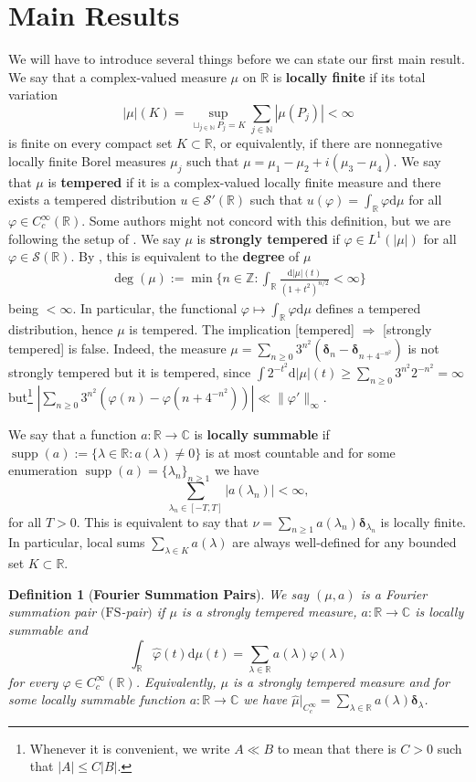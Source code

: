 \documentclass[a4paper,reqno,12pt]{amsart}
\DeclareMathOperator{\supp}{\mathrm{supp}}
\newtheorem{definition}{Definition}
\renewcommand{\S}{\mathcal{S}}
\newcommand{\n}{\mathbb{N}}
\newcommand{\z}{\mathbb{Z}}
\renewcommand{\r}{\mathbb{R}}
\newcommand{\cp}{\mathbb{C}} %
\newcommand{\ft}{\widehat}
\newcommand{\bo}{\boldsymbol}
\newcommand{\la}{\lambda}
\newcommand{\p}{\varphi}
\renewcommand{\d}{\mathrm{d}}
\newcommand{\1}{{\bf 1}}
\newcommand{\fs}{\mathrm{FS}}
\renewcommand{\emph}[1]{{\bf #1}}
\renewcommand{\1}{{\bo 1}}
\newcommand{\del}{{\bo \delta}}
\begin{document}
\section{Main Results}
We will have to introduce several things before we can state our first main result. We say that a complex-valued measure $\mu$ on $\r$ is \emph{locally finite} if its total variation 
$$
|\mu|(K) = \sup_{\sqcup_{j\in\n} P_j = K} \sum_{j\in\n} |\mu(P_j)| < \infty
$$
is finite on every compact set $K\subset \r$, or equivalently, if there are nonnegative locally finite Borel measures $\mu_{j}$ such that $\mu=\mu_1-\mu_2 + i(\mu_3-\mu_4)$. We say that $\mu$ is \emph{tempered} if it is a complex-valued locally finite measure and there exists a tempered distribution $u\in \S'(\r)$ such that $u(\p)=\int_\r \p \d\mu$ for all $\p\in C^\infty_c(\r)$. Some authors might not concord with this definition, but we are following the setup of \cite{BS}. We say  $\mu$ is \emph{strongly tempered} if $\p\in L^1(|\mu|)$ for all $\p\in \S(\r)$. By \cite[Prop. 2.5]{BS}, this is equivalent to the  \emph{degree} of $\mu$
\begin{align}\label{eq:decaymu}
\deg(\mu):=\min \bigg\{ n\in \z : \int_\r \frac{\d|\mu|(t)}{(1+t^2)^{n/2}}<\infty\bigg\}
\end{align}
being $<\infty$. In particular, the functional $\p \mapsto \int_\r \p \d\mu$ defines a tempered distribution, hence $\mu$ is tempered.  The implication [tempered] $\Rightarrow$ [strongly tempered] is false. Indeed, the measure
$
\mu = \sum_{n\geq 0} 3^{n^2}(\del_{n}-\del_{n+4^{-n^2}})
$
is not strongly tempered but it is tempered, since $\int 2^{-t^2}\d |\mu|(t)\geq  \sum_{n\geq 0} 3^{n^2}2^{-n^2}=\infty$ but\footnote{Whenever it is convenient, we write $A\ll B$ to mean that there is $C>0$ such that $|A|\leq C|B|$.} $|\sum_{n\geq 0} 3^{n^2}(\p({n})-\p({n+4^{-n^2}}))|\ll \|\p '\|_\infty$. 

We say that a function $a:\r\to\cp$ is \emph{locally summable} if $\supp(a):=\{\la\in \r : a(\la)\neq 0\}$ is at most countable and for some enumeration $\supp(a)=\{\la_n\}_{n\geq 1}$ we have 
$$\sum_{\la_n \in [-T,T]} |a(\la_n)|<\infty,$$
for all $T>0$. This is equivalent to say that $\nu=\sum_{n\geq 1} a(\la_n)\del_{\la_n}$ is locally finite. In particular, local sums $\sum_{\la \in K} a(\la)$ are always well-defined for any bounded set $K\subset \r$. 

\begin{definition}[\emph{Fourier Summation Pairs}]
We say $(\mu,a)$ is a Fourier summation pair $(\fs$-pair$)$ if $\mu$ is a strongly tempered measure, $a:\r\to\cp$ is {locally summable} and
$$
\int_\r \ft \p(t)\d\mu(t) = \sum_{\la\in\r} a(\la)\p(\la)
$$
for every $\p\in C^\infty_c(\r)$. Equivalently, $\mu$ is a strongly tempered measure and for some locally summable function $a:\r\to\cp$ we have $\ft \mu|_{C^\infty_c}=\sum_{\la\in\r} a(\la)\del_{\la}$. 
\end{definition}
\end{document}

